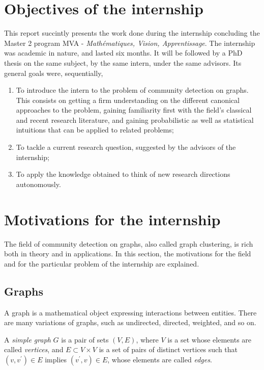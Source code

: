 \documentclass[../../main.tex]{subfiles} %
\begin{document}
\section{Objectives of the internship}
This report succintly presents the work done during the internship 
concluding the Master 2 program MVA - \textit{Mathématiques, Vision, 
Apprentissage}. The internship was academic in nature, and lasted six months. 
It will be followed by a PhD thesis on the same subject, by the same intern, 
under the same advisors. Its general goals were, sequentially,
\begin{enumerate}[label=\raisenth*]
	\item To introduce the intern to the problem of community detection on 
	graphs. This consists on getting a firm understanding on the different 
	canonical approaches to the problem, gaining familiarity first with the 
	field's classical and recent research literature, and gaining probabilistic 
	as well as statistical intuitions that can be applied to related problems;
	\item To tackle a current research question, suggested by the advisors of 
	the internship;
	\item To apply the knowledge obtained to think of new research 
	directions autonomously.
\end{enumerate}

\section{Motivations for the internship}
The field of community detection on graphs, also called graph clustering, is rich 
both in theory and in applications. In this section, the motivations for the field 
and for the particular problem of the internship are explained.

\subsection{Graphs}
A graph is a mathematical object expressing interactions between entities. 
There are many variations of graphs, such as undirected, directed, weighted, 
and so on.
\begin{definition}
	A \textit{simple graph} \(G\) is a pair of sets \((V, E)\), where \(V\) is a set 
	whose elements are called \textit{vertices}, and \(E \subset V \times V\) is a 
	set of pairs of 
	distinct vertices such that \((v, v^\prime) \in E\) implies \((v^\prime, v) \in 
	E\), whose 
	elements 
	are called \textit{edges}.
\end{definition}
\end{document}
